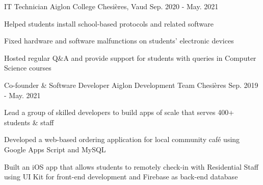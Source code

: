 \begin{cventries}

  \cventry
    {IT Technician}
    {Aiglon College}
    {Chesières, Vaud}
    {Sep. 2020 - May. 2021}
    {
      \begin{cvitems}
        \item {Helped students install school-based protocols and related software}
        \item {Fixed hardware and software malfunctions on students' electronic devices}
        \item {Hosted regular Q\&A and provide support for students with queries
in Computer Science courses}
      \end{cvitems}
    }

  \cventry
    {Co-founder \& Software Developer}
    {Aiglon Development Team}
    {Chesières}
    {Sep. 2019 - May. 2021}
    {
      \begin{cvitems}
        \item {Lead a group of skilled developers to build apps of scale that serves 400+ students \& staff}
        \item {Developed a web-based ordering application for local community café using Google Apps Script and MySQL}
        \item {Built an iOS app that allows students to remotely check-in with Residential Staff using UI Kit for front-end development and Firebase as back-end database}
      \end{cvitems}
    }
\end{cventries}
